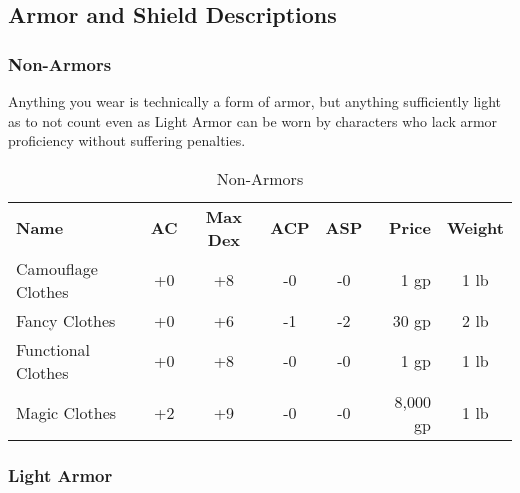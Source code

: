 \subsection{Armor and Shield Descriptions}

\subsubsection{Non-Armors}

Anything you wear is technically a form of armor, but anything sufficiently light as to not count even as Light Armor can be worn by characters who lack armor proficiency without suffering penalties.

\begin{table}[htb]
\caption{Non-Armors}
\centering
\begin{tabular}{l *{4}{c} r c}
\textbf{Name} & \textbf{AC} & \textbf{Max Dex} & \textbf{ACP} & \textbf{ASP} & \textbf{Price} & \textbf{Weight}\\
Camouflage Clothes & +0 & +8 & -0 & -0 & 1 gp & 1 lb\\
Fancy Clothes & +0 & +6 & -1 & -2 & 30 gp & 2 lb\\
Functional Clothes & +0 & +8 & -0 & -0 & 1 gp & 1 lb\\
Magic Clothes & +2 & +9 & -0 & -0 & 8,000 gp & 1 lb\\
\end{tabular}
\end{table}


\subsubsection{Light Armor}

